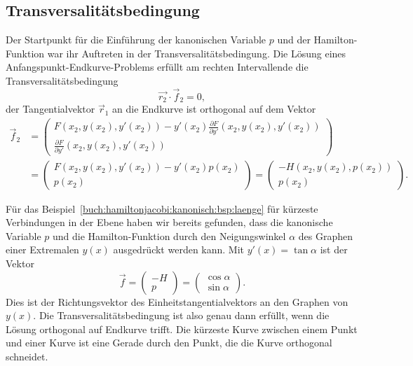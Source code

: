 \subsection{Transversalitätsbedingung}
Der Startpunkt für die Einführung der kanonischen Variable $p$ und
der Hamilton-Funktion war ihr Auftreten in der Transversalitätsbedingung.
Die Lösung eines Anfangspunkt-End\-kur\-ve-Problems erfüllt am rechten 
Intervallende die Transversalitätsbedingung
\[
\vec{r_2}\cdot \vec{f}_2=0,
\]
der Tangentialvektor $\vec{r}_1$ an die Endkurve ist orthogonal auf
dem Vektor
\begin{align*}
\vec{f}_2
&=
\begin{pmatrix}
\displaystyle
F(x_2,y(x_2),y'(x_2))-y'(x_2)\frac{\partial F}{\partial y'}(x_2,y(x_2),y'(x_2))
\\[5pt]
\displaystyle
\frac{\partial F}{\partial y'}(x_2,y(x_2),y'(x_2))
\end{pmatrix}
\\
&=
\begin{pmatrix}
F(x_2,y(x_2),y'(x_2)) - y'(x_2) p(x_2) \\
p(x_2)
\end{pmatrix}
=
\begin{pmatrix}
-H(x_2,y(x_2),p(x_2))\\
p(x_2)
\end{pmatrix}.
\end{align*}

\begin{beispiel}
Für das Beispiel~\ref{buch:hamiltonjacobi:kanonisch:bsp:laenge}
für kürzeste Verbindungen in der Ebene haben wir bereits gefunden,
dass die kanonische Variable $p$ und die Hamilton-Funktion durch 
den Neigungswinkel $\alpha$ des Graphen einer Extremalen $y(x)$
ausgedrückt werden kann.
Mit $y'(x)=\tan\alpha$ ist der Vektor
\[
\vec{f}
=
\begin{pmatrix}
-H\\
p
\end{pmatrix}
=
\begin{pmatrix}
\cos\alpha\\
\sin\alpha
\end{pmatrix}.
\]
Dies ist der Richtungsvektor des Einheitstangentialvektors an
den Graphen von $y(x)$.
Die Transversalitätsbedingung ist also genau dann erfüllt, wenn die
Lösung orthogonal auf Endkurve trifft.
Die kürzeste Kurve zwischen einem Punkt und einer Kurve ist eine
Gerade durch den Punkt, die die Kurve orthogonal schneidet.
\end{beispiel}

